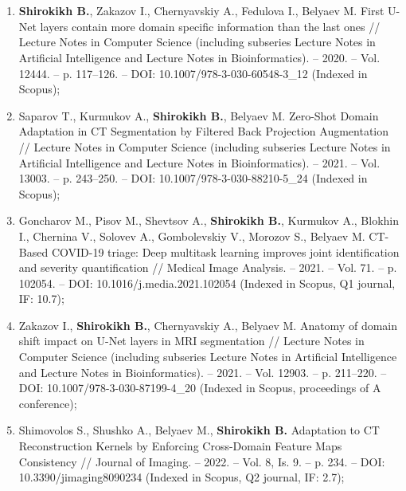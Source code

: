 

\section*{\bibtitleauthorEn}


\begin{enumerate}
	
	\item \textbf{Shirokikh B.}, Zakazov I., Chernyavskiy A., Fedulova I., Belyaev M. First U-Net layers contain more domain specific information than the last ones // Lecture Notes in Computer Science (including subseries Lecture Notes in Artificial Intelligence and Lecture Notes in Bioinformatics). -- 2020. -- Vol. 12444. -- p. 117--126. -- DOI: 10.1007/978-3-030-60548-3\_12 (Indexed in Scopus);
	
    \item Saparov T., Kurmukov A., \textbf{Shirokikh B.}, Belyaev M. Zero-Shot Domain Adaptation in CT Segmentation by Filtered Back Projection Augmentation // Lecture Notes in Computer Science (including subseries Lecture Notes in Artificial Intelligence and Lecture Notes in Bioinformatics). -- 2021. -- Vol. 13003. -- p. 243--250. -- DOI: 10.1007/978-3-030-88210-5\_24 (Indexed in Scopus);
    
    \item Goncharov M.\footnotemark[1], Pisov M.\footnotemark[1], Shevtsov A.\footnotemark[1], \textbf{Shirokikh B.}\footnotemark[1], Kurmukov A., Blokhin I., Chernina V., Solovev A., Gombolevskiy V., Morozov S., Belyaev M. CT-Based COVID-19 triage: Deep multitask learning improves joint identification and severity quantification // Medical Image Analysis. -- 2021. -- Vol. 71. -- p. 102054. -- DOI: 10.1016/j.media.2021.102054  (Indexed in Scopus, Q1 journal, IF: 10.7);
    
    \item  Zakazov I.\footnotemark[2], \textbf{Shirokikh B.}\footnotemark[2], Chernyavskiy A., Belyaev M. Anatomy of domain shift impact on U-Net layers in MRI segmentation // Lecture Notes in Computer Science (including subseries Lecture Notes in Artificial Intelligence and Lecture Notes in Bioinformatics). -- 2021. -- Vol. 12903. -- p. 211--220. -- DOI: 10.1007/978-3-030-87199-4\_20  (Indexed in Scopus, proceedings of A conference);
    
    \item Shimovolos S., Shushko A., Belyaev M., \textbf{Shirokikh B.} Adaptation to CT Reconstruction Kernels by Enforcing Cross-Domain Feature Maps Consistency // Journal of Imaging. -- 2022. -- Vol. 8, Is. 9. -- p. 234. -- DOI: 10.3390/jimaging8090234 (Indexed in Scopus, Q2 journal, IF: 2.7);
    

\end{enumerate}
